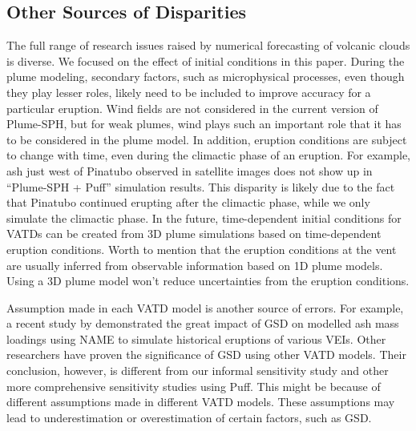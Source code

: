 \documentclass[utf8]{frontiersSCNS} %
\begin{document}
\subsection{Other Sources of Disparities}
The full range of research issues raised by numerical forecasting of volcanic clouds is diverse. We focused on the effect of initial conditions in this paper. During the plume modeling, secondary factors, such as microphysical processes, even though they play lesser roles, likely need to be included to improve accuracy for a particular eruption. Wind fields are not considered in the current version of Plume-SPH, but for weak plumes, wind plays such an important role that it has to be considered in the plume model. In addition, eruption conditions are subject to change with time, even during the climactic phase of an eruption. For example, ash just west of Pinatubo observed in satellite images does not show up in ``Plume-SPH + Puff'' simulation results. This disparity is likely due to the fact that Pinatubo continued erupting after the climactic phase, while we only simulate the climactic phase. In the future, time-dependent initial conditions for VATDs can be created from 3D plume simulations based on time-dependent eruption conditions. Worth to mention that the eruption conditions at the vent are usually inferred from observable information based on 1D plume models. Using a 3D plume model won't reduce uncertainties from the eruption conditions.

Assumption made in each VATD model is another source of errors. For example, a recent study by \citet{osman2020sensitivity} demonstrated the great impact of GSD on modelled ash mass loadings using NAME\citep{jones2007uk} to simulate historical eruptions of various VEIs. Other researchers \citep{beckett2015sensitivity,scollo2008parametric} have proven the significance of GSD using other VATD models. Their conclusion, however, is different from our informal sensitivity study and other more comprehensive sensitivity studies using Puff. This might be because of different assumptions made in different VATD models. These assumptions may lead to underestimation or overestimation of certain factors, such as GSD.
\end{document}
